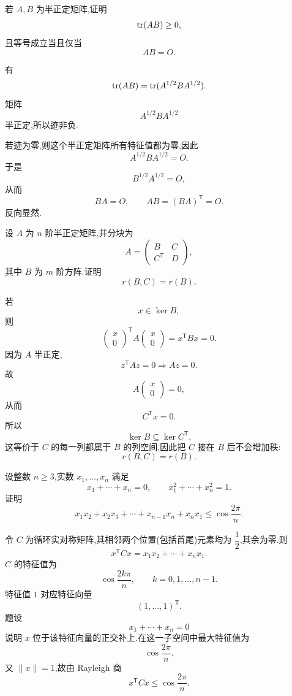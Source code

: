 \begin{example}
若 $A,B$ 为半正定矩阵,证明
\[
\operatorname{tr}(AB)\ge0,
\]
且等号成立当且仅当
\[
AB=O.
\]
\end{example}
\exampleblank

\begin{solution}
有
\[
\operatorname{tr}(AB)
=
\operatorname{tr}(A^{1/2}BA^{1/2}).
\]
矩阵
\[
A^{1/2}BA^{1/2}
\]
半正定,所以迹非负.

若迹为零,则这个半正定矩阵所有特征值都为零,因此
\[
A^{1/2}BA^{1/2}=O.
\]
于是
\[
B^{1/2}A^{1/2}=O,
\]
从而
\[
BA=O,
\qquad
AB=(BA)^{\mathsf T}=O.
\]
反向显然.
\end{solution}


\begin{example}
设 $A$ 为 $n$ 阶半正定矩阵,并分块为
\[
A=
\begin{pmatrix}
B&C\\
C^{\mathsf T}&D
\end{pmatrix},
\]
其中 $B$ 为 $m$ 阶方阵.证明
\[
r(B,C)=r(B).
\]
\end{example}
\exampleblank

\begin{solution}
若
\[
x\in\ker B,
\]
则
\[
\begin{pmatrix}x\\0\end{pmatrix}^{\mathsf T}
A
\begin{pmatrix}x\\0\end{pmatrix}
=
x^{\mathsf T}Bx=0.
\]
因为 $A$ 半正定,
\[
z^{\mathsf T}Az=0
\Longrightarrow
Az=0.
\]
故
\[
A\begin{pmatrix}x\\0\end{pmatrix}=0,
\]
从而
\[
C^{\mathsf T}x=0.
\]
所以
\[
\ker B\subseteq\ker C^{\mathsf T}.
\]
这等价于 $C$ 的每一列都属于 $B$ 的列空间,因此把 $C$ 接在 $B$ 后不会增加秩:
\[
\boxed{r(B,C)=r(B)}.
\]
\end{solution}


\begin{example}
设整数 $n\ge3$,实数 $x_1,\ldots,x_n$ 满足
\[
x_1+\cdots+x_n=0,
\qquad
x_1^2+\cdots+x_n^2=1.
\]
证明
\[
x_1x_2+x_2x_3+\cdots+x_{n-1}x_n+x_nx_1
\le
\cos\dfrac{2\pi}{n}.
\]
\end{example}
\exampleblank

\begin{solution}
令 $C$ 为循环实对称矩阵,其相邻两个位置(包括首尾)元素均为
$\dfrac12$,其余为零.则
\[
x^{\mathsf T}Cx
=
x_1x_2+\cdots+x_nx_1.
\]
$C$ 的特征值为
\[
\cos\dfrac{2k\pi}{n},
\qquad
k=0,1,\ldots,n-1.
\]
特征值 $1$ 对应特征向量
\[
(1,\ldots,1)^{\mathsf T}.
\]
题设
\[
x_1+\cdots+x_n=0
\]
说明 $x$ 位于该特征向量的正交补上.在这一子空间中最大特征值为
\[
\cos\dfrac{2\pi}{n}.
\]
又 $\|x\|=1$,故由 Rayleigh 商
\[
\boxed{
x^{\mathsf T}Cx
\le
\cos\dfrac{2\pi}{n}.
}
\]
\end{solution}


